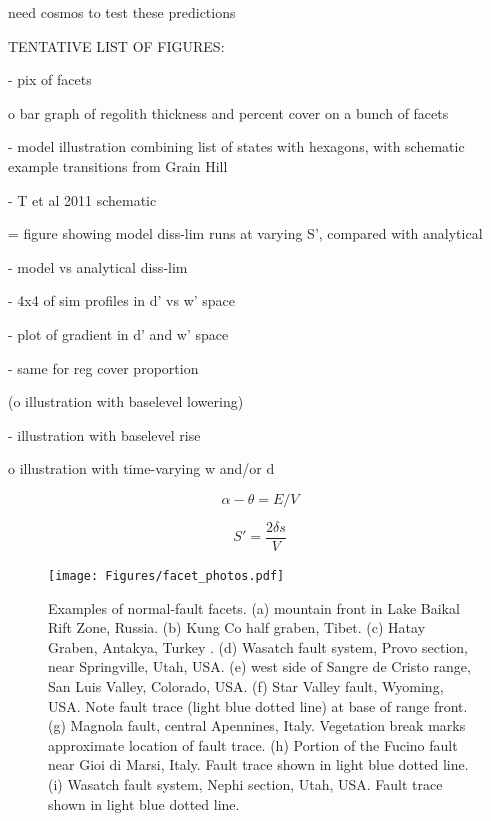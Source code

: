 need cosmos to test these predictions



TENTATIVE LIST OF FIGURES:

- pix of facets

o bar graph of regolith thickness and percent cover on a bunch of facets

- model illustration combining list of states with hexagons, with schematic example transitions from Grain Hill

- T et al 2011 schematic

= figure showing model diss-lim runs at varying S', compared with analytical

- model vs analytical diss-lim

- 4x4 of sim profiles in d' vs w' space

- plot of gradient in d' and w' space

- same for reg cover proportion

(o illustration with baselevel lowering)

- illustration with baselevel rise

o illustration with time-varying w and/or d



\begin{equation}
\alpha - \theta = E / V
\label{eq:angdif}
\end{equation}

\begin{equation}
S' = \frac{2\delta s}{V}
\label{eq:nddissefficiency}
\end{equation}





%
%
%
%


\begin{figure}[ht!]
\centerline{\texttt{[image: Figures/facet\_photos.pdf]}}
\caption{Examples of normal-fault facets. (a) mountain front in Lake Baikal Rift Zone, Russia. (b) Kung Co half graben, Tibet. (c) Hatay Graben, Antakya, Turkey \citep{boulton2009quantifying}. (d) Wasatch fault system, Provo section, near Springville, Utah, USA. (e) west side of Sangre de Cristo range, San Luis Valley, Colorado, USA. (f) Star Valley fault, Wyoming, USA. Note fault trace (light blue dotted line) at base of range front. (g) Magnola fault, central Apennines, Italy. Vegetation break marks approximate location of fault trace. (h) Portion of the Fucino fault near Gioi di Marsi, Italy. Fault trace shown in light blue dotted line. (i) Wasatch fault system, Nephi section, Utah, USA. Fault trace shown in light blue dotted line.}
\label{fig:facets}
\end{figure}

